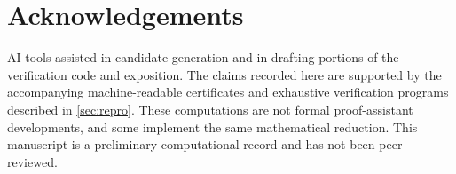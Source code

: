 \documentclass[11pt]{amsart}
\theoremstyle{definition}
\theoremstyle{remark}
\begin{document}
\section*{Acknowledgements}

AI tools assisted in candidate generation and in drafting portions of the
verification code and exposition. The claims recorded here are supported by
the accompanying machine-readable certificates and exhaustive verification
programs described in \cref{sec:repro}. These computations are not formal
proof-assistant developments, and some implement the same mathematical
reduction. This manuscript is a preliminary computational record and has not
been peer reviewed.



\end{document}
